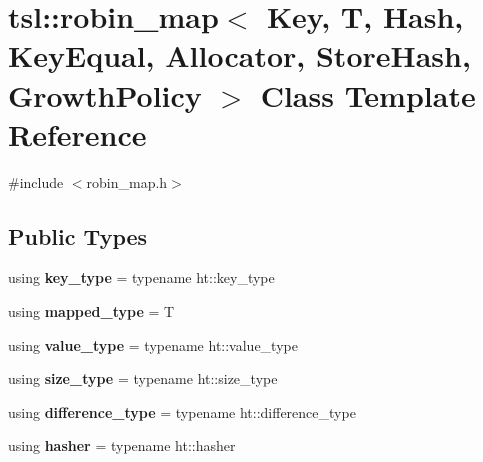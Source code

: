 \hypertarget{classtsl_1_1robin__map}{}\section{tsl\+::robin\+\_\+map$<$ Key, T, Hash, Key\+Equal, Allocator, Store\+Hash, Growth\+Policy $>$ Class Template Reference}
\label{classtsl_1_1robin__map}


{\ttfamily \#include $<$robin\+\_\+map.\+h$>$}

\subsection*{Public Types}
\begin{DoxyCompactItemize}
\item 
\mbox{\label{classtsl_1_1robin__map_a76bc73ce3005e1f39c254e9d5092f0c2}} 
using {\bfseries key\+\_\+type} = typename ht\+::key\+\_\+type
\item 
\mbox{\label{classtsl_1_1robin__map_a1d794edbc5168dca57ba353e0bee1784}} 
using {\bfseries mapped\+\_\+type} = T
\item 
\mbox{\label{classtsl_1_1robin__map_a02fd8609545d611ba93a01aa8edb40d5}} 
using {\bfseries value\+\_\+type} = typename ht\+::value\+\_\+type
\item 
\mbox{\label{classtsl_1_1robin__map_ae42652a724ddc26237783a8a8e0a3545}} 
using {\bfseries size\+\_\+type} = typename ht\+::size\+\_\+type
\item 
\mbox{\label{classtsl_1_1robin__map_a5aace92d99e7a1e30fa5ff1de6835408}} 
using {\bfseries difference\+\_\+type} = typename ht\+::difference\+\_\+type
\item 
\mbox{\label{classtsl_1_1robin__map_a27eb24e5f5c5343b7c83cb6dfd8b2d4a}} 
using {\bfseries hasher} = typename ht\+::hasher
\item 
\mbox{\label{classtsl_1_1robin__map_aa9982c8b5dd744a8c48333929d1587d8}} 

\end{DoxyCompactItemize}
